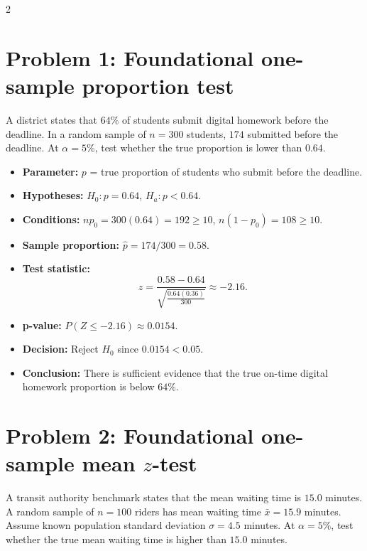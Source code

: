\begin{multicols}{2}

\section{Problem 1: Foundational one-sample proportion test}
A district states that \(64\%\) of students submit digital homework before the deadline. In a random sample of \(n=300\) students, \(174\) submitted before the deadline. At \(\alpha=5\%\), test whether the true proportion is lower than \(0.64\).

\begin{itemize}
    \item \textbf{Parameter:} \(p\) = true proportion of students who submit before the deadline.
    \item \textbf{Hypotheses:} \(H_0:p=0.64\), \(H_a:p<0.64\).
    \item \textbf{Conditions:} \(np_0=300(0.64)=192\ge10\), \(n(1-p_0)=108\ge10\).
    \item \textbf{Sample proportion:} \(\hat p=174/300=0.58\).
    \item \textbf{Test statistic:}
    \[
    z=\frac{0.58-0.64}{\sqrt{\frac{0.64(0.36)}{300}}}\approx -2.16.
    \]
    \item \textbf{p-value:} \(P(Z\le -2.16)\approx 0.0154\).
    \item \textbf{Decision:} Reject \(H_0\) since \(0.0154<0.05\).
    \item \textbf{Conclusion:} There is sufficient evidence that the true on-time digital homework proportion is below \(64\%\).
\end{itemize}

\begin{center}
\end{center}

\section{Problem 2: Foundational one-sample mean \texorpdfstring{\(z\)}{z}-test}
A transit authority benchmark states that the mean waiting time is \(15.0\) minutes. A random sample of \(n=100\) riders has mean waiting time \(\bar x=15.9\) minutes. Assume known population standard deviation \(\sigma=4.5\) minutes. At \(\alpha=5\%\), test whether the true mean waiting time is higher than \(15.0\) minutes.


\end{multicols}

